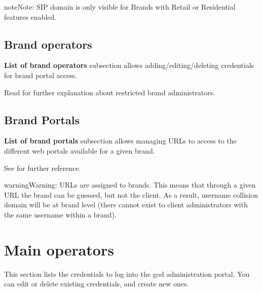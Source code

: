 \documentclass[letterpaper,10pt,english]{sphinxmanual}
\begin{document}
\begin{notice}{note}{Note:}
SIP domain is only visible for Brands with Retail or Residential features
enabled.
\end{notice}


\subsection{Brand operators}
\label{administration_portal/platform/brands:brand-operators}
\textbf{List of brand operators} subsection allows adding/editing/deleting credentials for brand portal access.

Read {\hyperref[api_rest/acls:acls]{}} for further explanation about restricted brand administrators.


\subsection{Brand Portals}
\label{administration_portal/platform/brands:brand-portals}
\textbf{List of brand portals} subsection allows managing URLs to access to the different web portals available for a given brand.

See {\hyperref[administration_portal/brand/settings/client_portals:client\string-portals]{}} for further reference.

\begin{notice}{warning}{Warning:}
URLs are assigned to brands. This means that through a given URL the brand can be guessed, but not the client.
As a result, username collision domain will be at brand level (there cannot exist to client administrators
with the same username within a brand).
\end{notice}


\section{Main operators}
\label{administration_portal/platform/main_operators::doc}\label{administration_portal/platform/main_operators:main-operators}
This section lists the credentials to log into the god administration portal. You can edit or delete existing credentials,
and create new ones.
\end{document}
